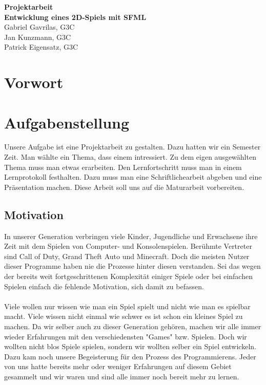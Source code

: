 \documentclass[12pt,a4paper]{scrartcl}
\begin{document}
\begin{titlepage}
\begin{center}

\vspace*{3cm}
\textbf{\huge{Projektarbeit}}\\
\vspace*{2cm}
\textbf{\large{Entwicklung eines 2D-Spiels mit SFML}}\\
\vspace*{5cm}
Gabriel Gavrilas, G3C\\
Jan Kunzmann, G3C\\
Patrick Eigensatz, G3C
\end{center}
\end{titlepage}




\newpage

\setcounter{page}{1}
\section*{Vorwort}


\newpage

\tableofcontents

\newpage

\section{Aufgabenstellung} 
Unsere Aufgabe ist eine Projektarbeit zu gestalten. Dazu hatten wir ein Semester Zeit. Man wählte ein Thema, dass einem intressiert. 
Zu dem eigen ausgewählten Thema muss man etwas erarbeiten. Den Lernfortschritt muss man in einem Lernprotokoll festhalten.
Dazu muss man eine Schriftlichearbeit abgeben und eine Präsentation machen. Diese Arbeit soll uns auf die Maturarbeit
vorbereiten.


\subsection{Motivation}
In unserer Generation verbringen viele Kinder, Jugendliche und Erwachsene
ihre Zeit mit dem Spielen von Computer- und Konsolenspielen.
Berühmte Vertreter sind Call of Duty, Grand Theft Auto und Minecraft.
Doch die meisten Nutzer dieser Programme haben nie die Prozesse hinter diesen verstanden.
Sei das wegen der bereits weit fortgeschrittenen Komplexität einiger Spiele
oder bei einfachen Spielen einfach die fehlende Motivation, sich damit zu befassen.\\
\\
Viele wollen nur wissen wie man ein Spiel spielt und nicht wie man es spielbar macht. Viele wissen nicht einmal wie schwer es ist schon ein
kleines Spiel zu machen.
Da wir selber auch zu dieser Generation gehören, 
machen wir alle immer wieder Erfahrungen mit den verschiedensten "Games" bzw. Spielen.
Doch wir wollten nicht blos Spiele spielen, 
sondern wir wollten selber ein Spiel entwickeln.
Dazu kam noch unsere Begeisterung für den Prozess des Programmierens.
Jeder von uns hatte bereits mehr oder weniger Erfahrungen auf diesem Gebiet gesammelt 
und wir waren und sind alle immer noch bereit mehr zu lernen.
\end{document}
